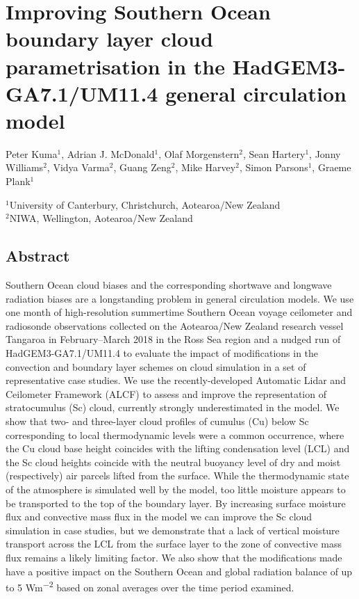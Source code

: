\chapter{Improving Southern Ocean boundary layer cloud para\-metrisation in the HadGEM3-GA7.1/UM11.4 general circulation model}

\vspace{-0.1cm}
\sffamily
{}
\raggedright
Peter Kuma$^1$, Adrian J. McDonald$^1$, Olaf Morgenstern$^2$, Sean Hartery$^1$, Jonny Williams$^2$, Vidya Varma$^2$, Guang Zeng$^2$, Mike Harvey$^2$, Simon Parsons$^1$, Graeme Plank$^1$
\footnotesize

\vspace{0.4cm}
\noindent
$^1$University of Canterbury, Christchurch, Aotearoa/New Zealand\\
$^2$NIWA, Wellington, Aotearoa/New Zealand

\normalsize
\normalfont
\justify

\section*{Abstract}

Southern Ocean cloud biases and the corresponding shortwave and longwave radiation
biases are a longstanding problem in general circulation models. We use one month of high-resolution summertime
Southern Ocean voyage ceilometer and radiosonde observations collected on the Aotearoa/New Zealand research vessel Tangaroa in February--March
2018 in the Ross Sea region
and a nudged run of HadGEM3-GA7.1/UM11.4 to
evaluate the impact of modifications in the convection and boundary layer
schemes on cloud simulation in a set of representative case studies. We use the recently-developed Automatic Lidar and Ceilometer Framework (ALCF) to assess and improve the representation of stratocumulus (Sc) cloud,
currently strongly underestimated in the model. We show that two- and three-layer cloud
profiles of cumulus (Cu) below Sc corresponding to local thermodynamic levels were a common occurrence, where
the Cu cloud base height coincides with the lifting condensation level (LCL)
and the Sc cloud heights coincide with the neutral buoyancy level of dry and moist (respectively) air
parcels lifted from the surface.
While the thermodynamic state of the atmosphere is simulated
well by the model, too little moisture appears to be transported to the top of the boundary layer. By increasing surface moisture flux and convective mass flux in the model we can improve the Sc cloud simulation in case studies, but we demonstrate that a lack of vertical moisture transport
across the LCL from the surface layer to the zone of convective mass flux remains a likely limiting factor.
We also show that the modifications made have a positive impact on the Southern Ocean and
global radiation balance of up to 5 \unit{Wm^{-2}} based on zonal averages over the time period examined.

